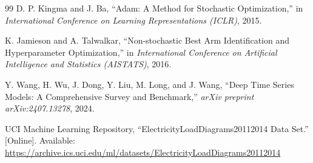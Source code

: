 \documentclass[10pt,journal]{IEEEtran}
\begin{document}
\begin{thebibliography}{99}
D. P. Kingma and J. Ba, ``Adam: A Method for Stochastic Optimization,'' in \emph{International Conference on Learning Representations (ICLR)}, 2015.

K. Jamieson and A. Talwalkar, ``Non-stochastic Best Arm Identification and Hyperparameter Optimization,'' in \emph{International Conference on Artificial Intelligence and Statistics (AISTATS)}, 2016.

Y. Wang, H. Wu, J. Dong, Y. Liu, M. Long, and J. Wang, ``Deep Time Series Models: A Comprehensive Survey and Benchmark,'' \emph{arXiv preprint arXiv:2407.13278}, 2024.

UCI Machine Learning Repository, ``ElectricityLoadDiagrams20112014 Data Set.'' [Online]. Available: \url{https://archive.ics.uci.edu/ml/datasets/ElectricityLoadDiagrams20112014}

\end{thebibliography}
\end{document}
